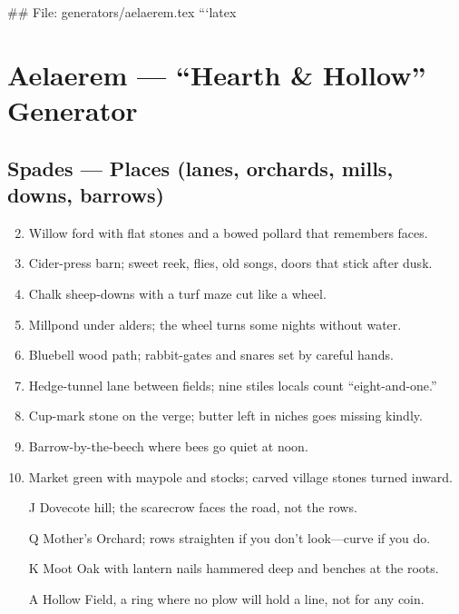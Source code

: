 ## File: generators/aelaerem.tex
```latex
\chapter{Aelaerem --- ``Hearth \& Hollow'' Generator}

\section*{Spades --- Places (lanes, orchards, mills, downs, barrows)}
\begin{enumerate}
\setcounter{enumi}{1}
\item Willow ford with flat stones and a bowed pollard that remembers faces.
\item Cider-press barn; sweet reek, flies, old songs, doors that stick after dusk.
\item Chalk sheep-downs with a turf maze cut like a wheel.
\item Millpond under alders; the wheel turns some nights without water.
\item Bluebell wood path; rabbit-gates and snares set by careful hands.
\item Hedge-tunnel lane between fields; nine stiles locals count ``eight-and-one.''
\item Cup-mark stone on the verge; butter left in niches goes missing kindly.
\item Barrow-by-the-beech where bees go quiet at noon.
\item Market green with maypole and stocks; carved village stones turned inward.
\item[J] Dovecote hill; the scarecrow faces the road, not the rows.
\item[Q] Mother's Orchard; rows straighten if you don't look---curve if you do.
\item[K] Moot Oak with lantern nails hammered deep and benches at the roots.
\item[A] Hollow Field, a ring where no plow will hold a line, not for any coin.
\end{enumerate}

